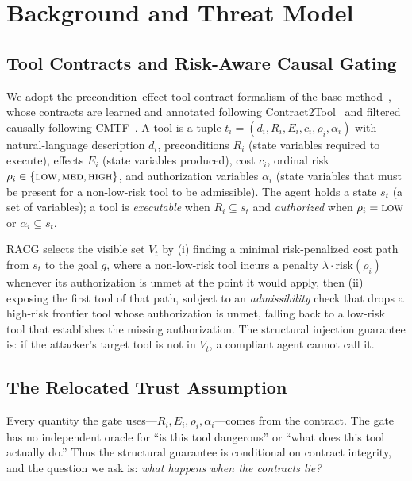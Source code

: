 \documentclass[conference,onecolumn]{IEEEtran}
\theoremstyle{definition}
\newcommand{\racg}{\textsc{RACG}}
\newcommand{\Vt}{V_t}
\begin{document}
\section{Background and Threat Model}
\label{sec:bg}

\subsection{Tool Contracts and Risk-Aware Causal Gating}
We adopt the precondition--effect tool-contract formalism of the base
method~\cite{iyer2026racg}, whose contracts are learned and annotated following
Contract2Tool~\cite{iyer2026contract2tool} and filtered causally following
CMTF~\cite{anon2026cmtf}. A tool is a tuple
$t_i = (d_i, R_i, E_i, c_i, \rho_i, \alpha_i)$ with natural-language description
$d_i$, preconditions $R_i$ (state variables required to execute), effects $E_i$
(state variables produced), cost $c_i$, ordinal risk $\rho_i \in
\{\textsc{low},\textsc{med},\textsc{high}\}$, and authorization variables
$\alpha_i$ (state variables that must be present for a non-low-risk tool to be
admissible). The agent holds a state $s_t$ (a set of variables); a tool is
\emph{executable} when $R_i \subseteq s_t$ and \emph{authorized} when
$\rho_i = \textsc{low}$ or $\alpha_i \subseteq s_t$.

\racg{} selects the visible set $\Vt$ by (i) finding a minimal risk-penalized
cost path from $s_t$ to the goal $g$, where a non-low-risk tool incurs a penalty
$\lambda\cdot\mathrm{risk}(\rho_i)$ whenever its authorization is unmet at the
point it would apply, then (ii) exposing the first tool of that path, subject to
an \emph{admissibility} check that drops a high-risk frontier tool whose
authorization is unmet, falling back to a low-risk tool that establishes the
missing authorization. The structural injection guarantee is: if the attacker's
target tool is not in $\Vt$, a compliant agent cannot call it.

\subsection{The Relocated Trust Assumption}
Every quantity the gate uses---$R_i, E_i, \rho_i, \alpha_i$---comes from the
contract. The gate has no independent oracle for ``is this tool dangerous'' or
``what does this tool actually do.'' Thus the structural guarantee is
conditional on contract integrity, and the question we ask is: \emph{what
happens when the contracts lie?}
\end{document}
